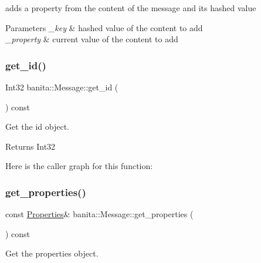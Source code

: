 adds a property from the content of the message and it\textquotesingle{}s hashed value 


\begin{DoxyParams}{Parameters}
{\em \+\_\+key} & hashed value of the content to add \\
\hline
{\em \+\_\+property} & current value of the content to add \\
\hline
\end{DoxyParams}
\mbox{\label{classbanita_1_1_message_ac28e1eb6fc91d5cd728bcdc398458d36}} 
\subsubsection{\texorpdfstring{get\_id()}{get\_id()}}
{\footnotesize\ttfamily Int32 banita\+::\+Message\+::get\+\_\+id (\begin{DoxyParamCaption}{ }\end{DoxyParamCaption}) const\hspace{0.3cm}{\ttfamily [inline]}}



Get the id object. 

\begin{DoxyReturn}{Returns}
Int32 
\end{DoxyReturn}
Here is the caller graph for this function\+:
\mbox{\label{classbanita_1_1_message_a339b3ec9d64aeaeb726fa90d2a6162c3}} 
\subsubsection{\texorpdfstring{get\_properties()}{get\_properties()}}
{\footnotesize\ttfamily const \mbox{\hyperlink{classbanita_1_1_message_ab38626a5034f095bf7d856e95ab89290}{Properties}}\& banita\+::\+Message\+::get\+\_\+properties (\begin{DoxyParamCaption}{ }\end{DoxyParamCaption}) const\hspace{0.3cm}{\ttfamily [inline]}}



Get the properties object. 

